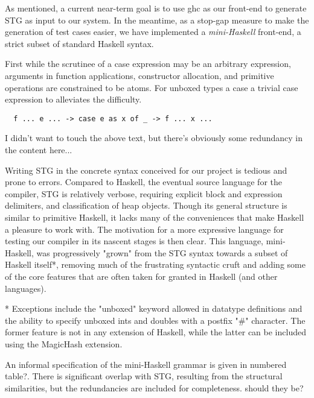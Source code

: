 \documentclass{llncs}
\begin{document}
As mentioned, a current near-term goal is to use ghc as our front-end
to generate STG as input to our system.  In the meantime, as a stop-gap
measure to make the generation of test cases easier, we have implemented
a \emph{mini-Haskell} front-end, a strict subset of standard Haskell syntax.

First while the scrutinee of a case expression may be an arbitrary expression,
arguments in function applications, constructor allocation, and primitive
operations are constrained to be atoms.  For unboxed types a case
a trivial case expression to alleviates
the difficulty.
\begin{verbatim}
  f ... e ... -> case e as x of _ -> f ... x ...
\end{verbatim}

{\color{red} I didn't want to touch the above text, but there's obviously some 
redundancy in the content here...}

Writing STG in the concrete syntax conceived for our project is tedious and
prone to errors.  Compared to Haskell, the eventual source language for the
compiler, STG is relatively verbose, requiring explicit block and expression
delimiters, and classification of heap objects. Though its general structure is
similar to primitive Haskell, it lacks many of the conveniences that make
Haskell a pleasure to work with.  The motivation for a more expressive language
for testing our compiler in its nascent stages is then clear.  This language,
mini-Haskell, was progressively "grown" from the STG syntax towards a subset of
Haskell itself*, removing much of the frustrating syntactic cruft and adding
some of the core features that are often taken for granted in Haskell (and other
languages).

{\color{red}
* Exceptions include the "unboxed" keyword allowed in datatype definitions and
the ability to specify unboxed ints and doubles with a postfix "\#" character.
The former feature is not in any extension of Haskell, while the latter can be
included using the MagicHash extension.}


An informal specification of the mini-Haskell grammar is given in
{\color{red}numbered table?}.  There is significant overlap with STG, resulting
from the structural similarities, but the redundancies are included for
completeness. {\color{red} should they be?}


\end{document}
